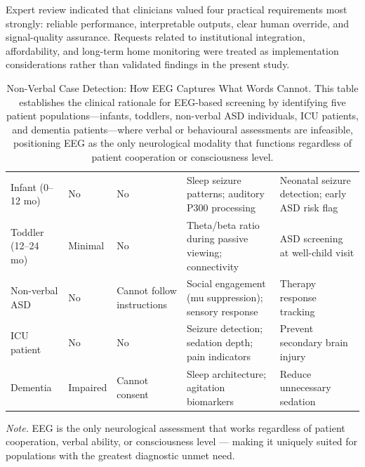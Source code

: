 \noindent Expert review indicated that clinicians valued four practical requirements most strongly: reliable performance, interpretable outputs, clear human override, and signal-quality assurance. Requests related to institutional integration, affordability, and long-term home monitoring were treated as implementation considerations rather than validated findings in the present study.



\begin{table}[!htbp]
\tablestripes\tablefontsize
\tablefontsize
\caption[Non-Verbal Case Detection: How EEG Captures What Words]{Non-Verbal Case Detection: How EEG Captures What Words Cannot. This table establishes the clinical rationale for EEG-based screening by identifying five patient populations---infants, toddlers, non-verbal ASD individuals, ICU patients, and dementia patients---where verbal or behavioural assessments are infeasible, positioning EEG as the only neurological modality that functions regardless of patient cooperation or consciousness level.}
\begin{tabularx}{\textwidth}{@{} >{\raggedright\arraybackslash}p{2.2cm} >{\raggedright\arraybackslash}p{1.5cm} >{\raggedright\arraybackslash}p{1.5cm} L L @{}}
\toprule
{} &  &  &  &  \\
\midrule
Infant (0--12 mo) & No & No & Sleep seizure patterns; auditory P300 processing & Neonatal seizure detection; early ASD risk flag \\
\addlinespace
Toddler (12--24 mo) & Minimal & No & Theta/beta ratio during passive viewing; connectivity & ASD screening at well-child visit \\
\addlinespace
Non-verbal ASD & No & Cannot follow instructions & Social engagement (mu suppression); sensory response & Therapy response tracking \\
\addlinespace
ICU patient & No & No & Seizure detection; sedation depth; pain indicators & Prevent secondary brain injury \\
\addlinespace
Dementia & Impaired & Cannot consent & Sleep architecture; agitation biomarkers & Reduce unnecessary sedation \\
\bottomrule
\end{tabularx}
\vspace{0.5em}\noindent\textit{Note.} EEG is the only neurological assessment that works regardless of patient cooperation, verbal ability, or consciousness level --- making it uniquely suited for populations with the greatest diagnostic unmet need.
\end{table}

